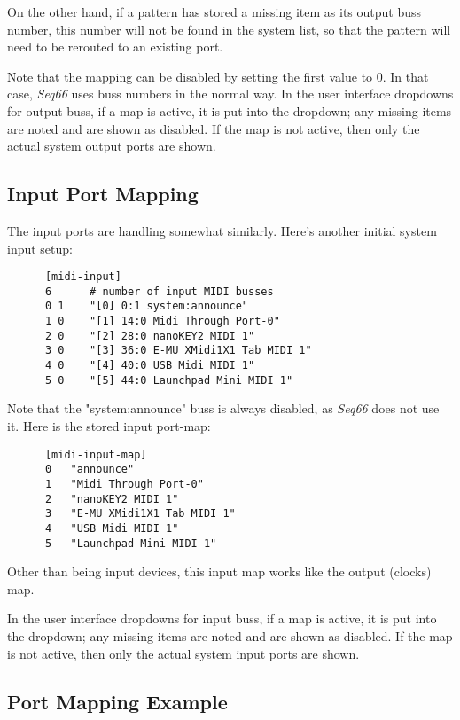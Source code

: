    On the other hand, if a pattern has stored a missing item as its output
   buss number, this number will not be found in the system list, so that the
   pattern will need to be rerouted to an existing port.

   Note that the mapping can be disabled by setting the first value to 0.  In
   that case, \textsl{Seq66} uses buss numbers in the normal way.
   In the user interface dropdowns for output buss, if a map is active, it is
   put into the dropdown; any missing items are noted and are shown as
   disabled.
   If the map is not active, then only the actual system output ports are shown.

\subsection{Input Port Mapping}
\label{subsec:input_port_mapping}

   The input ports are handling somewhat similarly.  Here's another
   initial system input setup:

   \begin{verbatim}
      [midi-input]
      6      # number of input MIDI busses
      0 1    "[0] 0:1 system:announce"
      1 0    "[1] 14:0 Midi Through Port-0"
      2 0    "[2] 28:0 nanoKEY2 MIDI 1"
      3 0    "[3] 36:0 E-MU XMidi1X1 Tab MIDI 1"
      4 0    "[4] 40:0 USB Midi MIDI 1"
      5 0    "[5] 44:0 Launchpad Mini MIDI 1"
   \end{verbatim}

   Note that the "system:announce" buss is always disabled, as \textsl{Seq66}
   does not use it.  Here is the stored input port-map:

   \begin{verbatim}
      [midi-input-map]
      0   "announce"
      1   "Midi Through Port-0"
      2   "nanoKEY2 MIDI 1"
      3   "E-MU XMidi1X1 Tab MIDI 1"
      4   "USB Midi MIDI 1"
      5   "Launchpad Mini MIDI 1"
   \end{verbatim}

   Other than being input devices, this input map works like the output
   (clocks) map.

   In the user interface dropdowns for input buss, if a map is active, it is
   put into the dropdown; any missing items are noted and are shown as
   disabled.
   If the map is not active, then only the actual system input ports are shown.

\subsection{Port Mapping Example}
\label{subsec:input_port_mapping_example}

